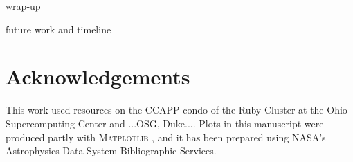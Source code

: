 \documentclass[aps,prd, amsmath,amssymb,superscriptaddress,showkeys,nofootinbib,reprint,preprintnumbers]{revtex4-1}
\begin{document}
wrap-up

future work and timeline

\section*{Acknowledgements}

This work used resources on the CCAPP condo of the Ruby Cluster at the Ohio Supercomputing Center \cite{OhioSupercomputerCenter1987} and ...OSG, Duke.... Plots in this manuscript were produced partly with \textsc{Matplotlib} \cite{Hunter:2007}, and it has been prepared using NASA's Astrophysics Data System Bibliographic Services.




\label{lastpage}
\end{document}

